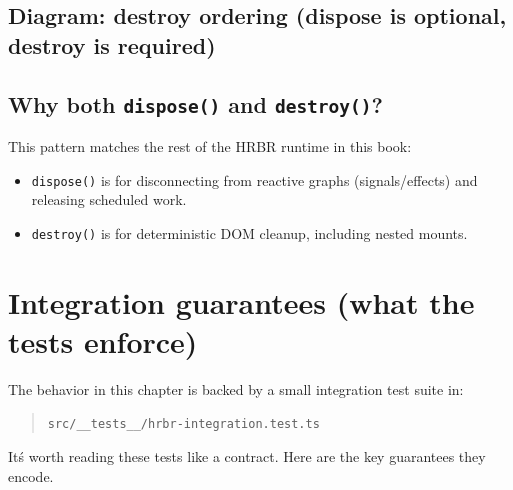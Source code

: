 \subsection*{Diagram: destroy ordering (dispose is optional, destroy is required)}
\begin{center}
\end{center}

\subsection{Why both \texttt{dispose()} and \texttt{destroy()}?}

This pattern matches the rest of the HRBR runtime in this book:

\begin{itemize}
\item \texttt{dispose()} is for disconnecting from reactive graphs (signals/effects) and releasing scheduled work.
\item \texttt{destroy()} is for deterministic DOM cleanup, including nested mounts.
\end{itemize}

\section{Integration guarantees (what the tests enforce)}

The behavior in this chapter is backed by a small integration test suite in:

\begin{quote}
	\texttt{src/\_\_tests\_\_/hrbr-integration.test.ts}
\end{quote}

It\'s worth reading these tests like a contract.
Here are the key guarantees they encode.

